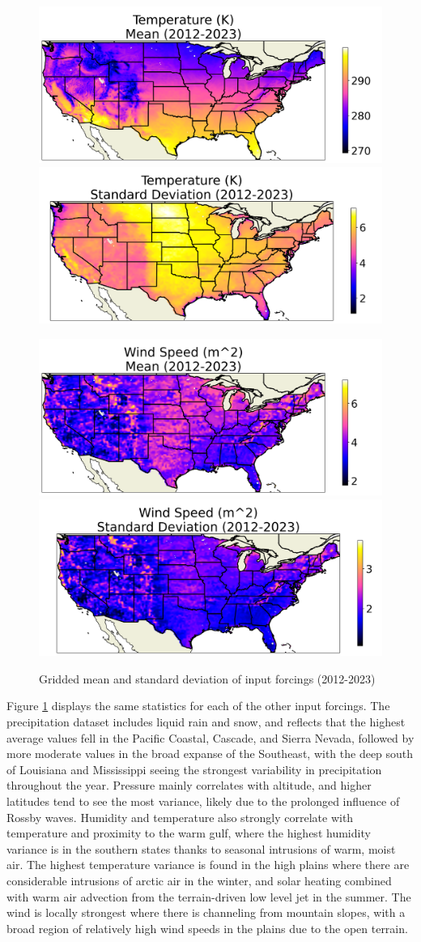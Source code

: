 \begin{figure}[hp!]
    \includegraphics[width=.48\linewidth]{figures/thesis-gridstats/gridstat-bulk_tmp_2012-1_2023-12_y000-195_x000-462_mean.png}
    \includegraphics[width=.48\linewidth]{figures/thesis-gridstats/gridstat-bulk_tmp_2012-1_2023-12_y000-195_x000-462_stdev.png}

    \includegraphics[width=.48\linewidth]{figures/thesis-gridstats/gridstat-bulk_windmag_2012-1_2023-12_y000-195_x000-462_mean.png}
    \includegraphics[width=.48\linewidth]{figures/thesis-gridstats/gridstat-bulk_windmag_2012-1_2023-12_y000-195_x000-462_stdev.png}
    \caption{Gridded mean and standard deviation of input forcings (2012-2023)}
    \label{gs-forcings}
\end{figure}

Figure \ref{gs-forcings} displays the same statistics for each of the other input forcings. The precipitation dataset includes liquid rain and snow, and reflects that the highest average values fell in the Pacific Coastal, Cascade, and Sierra Nevada, followed by more moderate values in the broad expanse of the Southeast, with the deep south of Louisiana and Mississippi seeing the strongest variability in precipitation throughout the year. Pressure mainly correlates with altitude, and higher latitudes tend to see the most variance, likely due to the prolonged influence of Rossby waves. Humidity and temperature also strongly correlate with temperature and proximity to the warm gulf, where the highest humidity variance is in the southern states thanks to seasonal intrusions of warm, moist air. The highest temperature variance is found in the high plains where there are considerable intrusions of arctic air in the winter, and solar heating combined with warm air advection from the terrain-driven low level jet in the summer. The wind is locally strongest where there is channeling from mountain slopes, with a broad region of relatively high wind speeds in the plains due to the open terrain.

